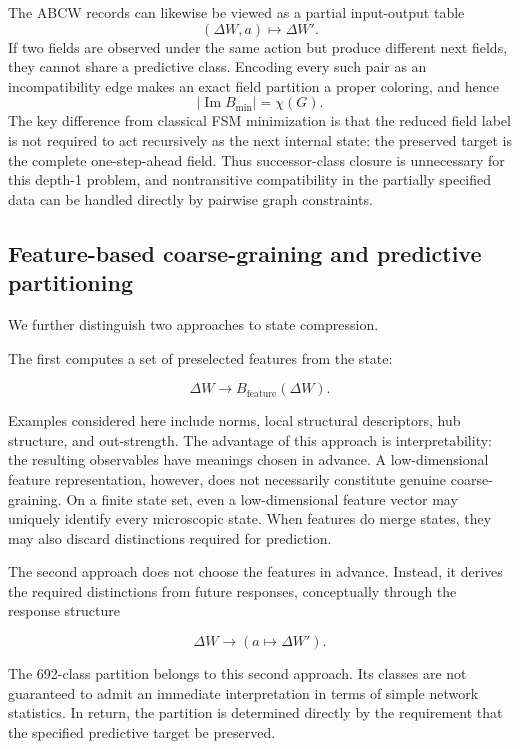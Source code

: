 \documentclass[
  11pt,
]{article}
\begin{document}
The ABCW records can likewise be viewed as a partial input-output table
\[
(\Delta W,a)\longmapsto\Delta W'.
\]
If two fields are observed under the same action but produce different
next fields, they cannot share a predictive class. Encoding every such
pair as an incompatibility edge makes an exact field partition a proper
coloring, and hence
\[
|\operatorname{Im}B_{\min}|=\chi(G).
\]
The key difference from classical FSM minimization is that the reduced
field label is not required to act recursively as the next internal
state: the preserved target is the complete one-step-ahead field. Thus
successor-class closure is unnecessary for this depth-1 problem, and
nontransitive compatibility in the partially specified data can be
handled directly by pairwise graph constraints.

\hypertarget{feature-based-coarse-graining-and-predictive-partitioning}{%
\subsection{Feature-based coarse-graining and predictive
partitioning}\label{feature-based-coarse-graining-and-predictive-partitioning}}

We further distinguish two approaches to state compression.

The first computes a set of preselected features from the state:

\[{\Delta W\longrightarrow B_{\mathrm{feature}}(\Delta W).}\]

Examples considered here include norms, local structural descriptors,
hub structure, and out-strength. The advantage of this approach is
interpretability: the resulting observables have meanings chosen in
advance. A low-dimensional feature representation, however, does not
necessarily constitute genuine coarse-graining. On a finite state set,
even a low-dimensional feature vector may uniquely identify every
microscopic state. When features do merge states, they may also discard
distinctions required for prediction.

The second approach does not choose the features in advance. Instead, it
derives the required distinctions from future responses, conceptually
through the response structure

\[{\Delta W\longrightarrow\left(a\longmapsto\Delta W'\right).}\]

The 692-class partition belongs to this second approach. Its classes are
not guaranteed to admit an immediate interpretation in terms of simple
network statistics. In return, the partition is determined directly by
the requirement that the specified predictive target be preserved.
\end{document}
